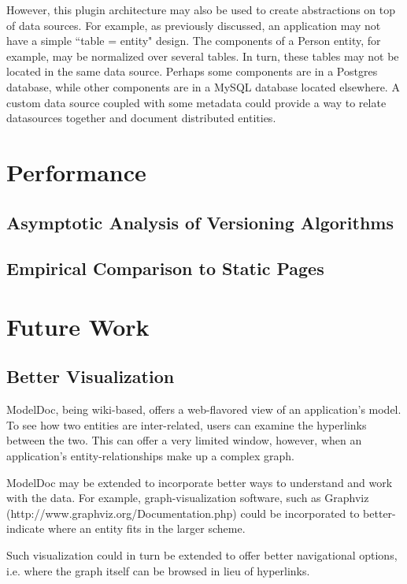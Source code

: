 \documentclass[twocolumn]{article}
\begin{document}
However, this plugin architecture may also be used to create abstractions on
top of data sources.  For example, as previously discussed, an application
may not have a simple ``table = entity" design.  The components of a Person
entity, for example, may be normalized over several tables.  In turn, these
tables may not be located in the same data source.  Perhaps some components are
in a Postgres database, while other components are in a MySQL database located
elsewhere.  A custom data source coupled with some metadata could provide a way
to relate datasources together and document distributed entities.

\section{Performance}

\subsection{Asymptotic Analysis of Versioning Algorithms}

\subsection{Empirical Comparison to Static Pages}

\section{Future Work}

\subsection{Better Visualization}

ModelDoc, being wiki-based, offers a web-flavored view of an application's
model.  To see how two entities are inter-related, users can examine the
hyperlinks between the two.  This can offer a very limited window, however,
when an application's entity-relationships make up a complex graph.

ModelDoc may be extended to incorporate better ways to understand and work with
the data.  For example, graph-visualization software, such as Graphviz
(http://www.graphviz.org/Documentation.php) could be incorporated to
better-indicate where an entity fits in the larger scheme.

Such visualization could in turn be extended to offer better navigational
options, i.e. where the graph itself can be browsed in lieu of hyperlinks.
\end{document}
